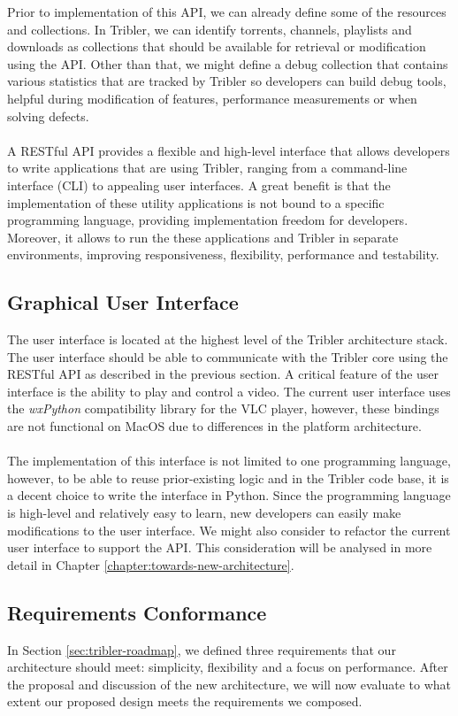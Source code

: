 Prior to implementation of this API, we can already define some of the resources and collections. In Tribler, we can identify torrents, channels, playlists and downloads as collections that should be available for retrieval or modification using the API. Other than that, we might define a debug collection that contains various statistics that are tracked by Tribler so developers can build debug tools, helpful during modification of features, performance measurements or when solving defects.\\\\
A RESTful API provides a flexible and high-level interface that allows developers to write applications that are using Tribler, ranging from a command-line interface (CLI) to appealing user interfaces. A great benefit is that the implementation of these utility applications is not bound to a specific programming language, providing implementation freedom for developers. Moreover, it allows to run the these applications and Tribler in separate environments, improving responsiveness, flexibility, performance and testability.

\subsection{Graphical User Interface}
The user interface is located at the highest level of the Tribler architecture stack. The user interface should be able to communicate with the Tribler core using the RESTful API as described in the previous section. A critical feature of the user interface is the ability to play and control a video. The current user interface uses the \emph{wxPython} compatibility library for the VLC player, however, these bindings are not functional on MacOS due to differences in the platform architecture.\\\\
The implementation of this interface is not limited to one programming language, however, to be able to reuse prior-existing logic and in the Tribler code base, it is a decent choice to write the interface in Python. Since the programming language is high-level and relatively easy to learn, new developers can easily make modifications to the user interface. We might also consider to refactor the current user interface to support the API. This consideration will be analysed in more detail in Chapter \ref{chapter:towards-new-architecture}. 

\subsection{Requirements Conformance}
In Section \ref{sec:tribler-roadmap}, we defined three requirements that our architecture should meet: simplicity, flexibility and a focus on performance. After the proposal and discussion of the new architecture, we will now evaluate to what extent our proposed design meets the requirements we composed.

